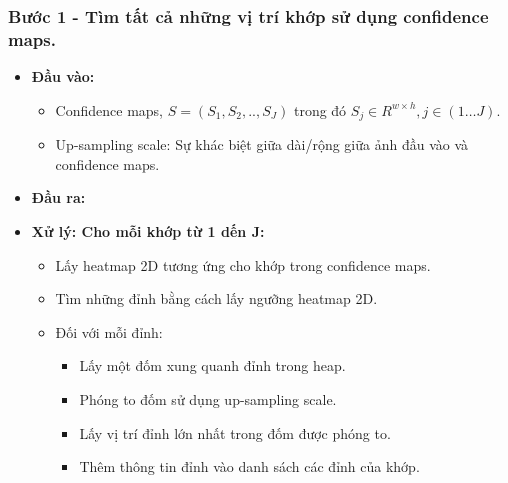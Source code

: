 \subsubsection{Bước 1 - Tìm tất cả những vị trí khớp sử dụng confidence maps.}
\begin{itemize}
\item \textbf{Đầu vào:}
	\begin{itemize}
	\item Confidence maps, $S = (S_1, S_2, .., S_J)$ trong đó $S_j \in R^{w \times h},j \in (1 \ldots J)$.
	\item Up-sampling scale: Sự khác biệt giữa dài/rộng giữa ảnh đầu vào và confidence maps.
	\end{itemize}
\item \textbf{Đầu ra: }
\item \textbf{Xử lý: Cho mỗi khớp từ 1 dến J:}
	\begin{itemize}
	\item Lấy heatmap 2D tương ứng cho khớp trong confidence maps.
	\item Tìm những đỉnh bằng cách lấy ngưỡng heatmap 2D.
	\item Đối với mỗi đỉnh:
		\begin{itemize}
		\item Lấy một đốm xung quanh đỉnh trong heap.
		\item Phóng to đốm sử dụng up-sampling scale.
		\item Lấy vị trí đỉnh lớn nhất trong đốm được phóng to.
		\item Thêm thông tin đỉnh vào danh sách các đỉnh của khớp.
		\end{itemize}
	\end{itemize}
\end{itemize}

